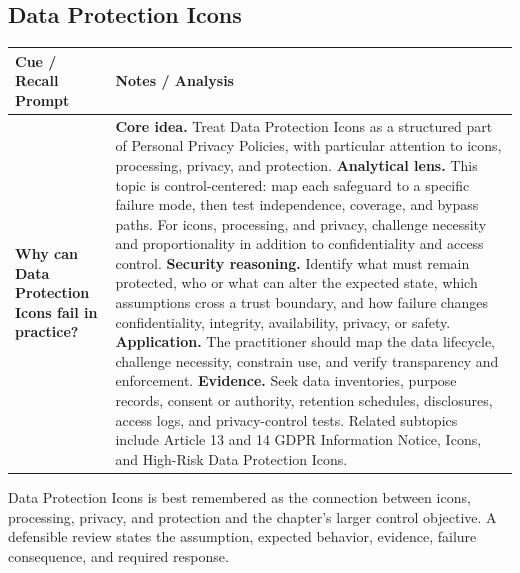 \documentclass[11pt]{article}
\newcommand{\CornellHeader}{%
\rowcolor{Navy}\color{white}\bfseries Cue / Recall Prompt & \color{white}\bfseries Notes / Analysis\\\hline}
\newcommand{\CornellRow}[2]{%
\cellcolor{CueGray}\RaggedRight\textbf{#1} & \RaggedRight #2\\\hline}
\begin{document}
\subsection*{Data Protection Icons}
\begin{longtable}{>{\RaggedRight\arraybackslash}p{}|>{\RaggedRight\arraybackslash}p{}}
\CornellHeader
\CornellRow{Why can Data Protection Icons fail in practice?}{\textbf{Core idea.} Treat Data Protection Icons as a structured part of Personal Privacy Policies, with particular attention to icons, processing, privacy, and protection. \textbf{Analytical lens.} This topic is control-centered: map each safeguard to a specific failure mode, then test independence, coverage, and bypass paths. For icons, processing, and privacy, challenge necessity and proportionality in addition to confidentiality and access control. \textbf{Security reasoning.} Identify what must remain protected, who or what can alter the expected state, which assumptions cross a trust boundary, and how failure changes confidentiality, integrity, availability, privacy, or safety. \textbf{Application.} The practitioner should map the data lifecycle, challenge necessity, constrain use, and verify transparency and enforcement. \textbf{Evidence.} Seek data inventories, purpose records, consent or authority, retention schedules, disclosures, access logs, and privacy-control tests. Related subtopics include Article 13 and 14 GDPR Information Notice, Icons, and High-Risk Data Protection Icons.}
\end{longtable}
\begin{topicsummary}
Data Protection Icons is best remembered as the connection between icons, processing, privacy, and protection and the chapter's larger control objective. A defensible review states the assumption, expected behavior, evidence, failure consequence, and required response.
\end{topicsummary}
\end{document}
